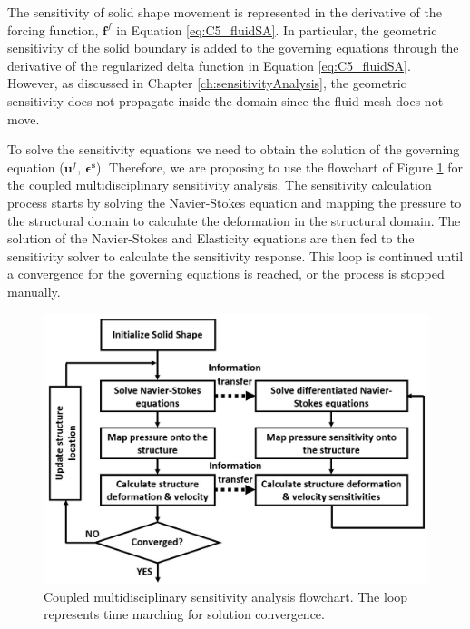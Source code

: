 %
The sensitivity of solid shape movement is represented in the derivative of the forcing function, $\mathbf{f}^f$ in Equation \eqref{eq:C5_fluidSA}. In particular, the geometric sensitivity of the solid boundary is added to the governing equations through the derivative of the regularized delta function in Equation \eqref{eq:C5_fluidSA}. However, as discussed in Chapter \ref{ch:sensitivityAnalysis}, the geometric sensitivity does not propagate inside the domain since the fluid mesh does not move.

To solve the sensitivity equations we need to obtain the solution of the governing equation ($\mathbf{u}^f$, $\mathbf{\epsilon^s}$). Therefore, we are proposing to use the flowchart of Figure \ref{fig:C5_SAflowchart} for the coupled multidisciplinary sensitivity analysis. The sensitivity calculation process starts by solving the Navier-Stokes equation and mapping the pressure to the structural domain to calculate the deformation in the structural domain. The solution of the Navier-Stokes and Elasticity equations are then fed to the sensitivity solver to calculate the sensitivity response. This loop is continued until a convergence for the governing equations is reached, or the process is stopped manually. 
%
\begin{figure}[H]
    \centering
    \includegraphics[width=14.00cm]{Chapter_5/figure/couple_SA_flowchart.jpg}
    \caption{Coupled multidisciplinary sensitivity analysis flowchart. The loop represents time marching for solution convergence.}
    \label{fig:C5_SAflowchart}
\end{figure}
%